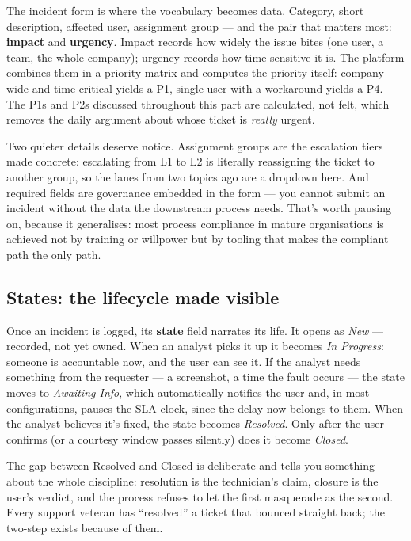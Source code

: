 The incident form is where the vocabulary becomes data. Category, short description, affected user, assignment group — and the pair that matters most: \textbf{impact} and \textbf{urgency}. Impact records how widely the issue bites (one user, a team, the whole company); urgency records how time-sensitive it is. The platform combines them in a priority matrix and computes the priority itself: company-wide and time-critical yields a P1, single-user with a workaround yields a P4. The P1s and P2s discussed throughout this part are calculated, not felt, which removes the daily argument about whose ticket is \emph{really} urgent.


Two quieter details deserve notice. Assignment groups are the escalation tiers made concrete: escalating from L1 to L2 is literally reassigning the ticket to another group, so the lanes from two topics ago are a dropdown here. And required fields are governance embedded in the form — you cannot submit an incident without the data the downstream process needs. That's worth pausing on, because it generalises: most process compliance in mature organisations is achieved not by training or willpower but by tooling that makes the compliant path the only path.



\subsection{States: the lifecycle made visible}


Once an incident is logged, its \textbf{state} field narrates its life. It opens as \emph{New} — recorded, not yet owned. When an analyst picks it up it becomes \emph{In Progress}: someone is accountable now, and the user can see it. If the analyst needs something from the requester — a screenshot, a time the fault occurs — the state moves to \emph{Awaiting Info}, which automatically notifies the user and, in most configurations, pauses the SLA clock, since the delay now belongs to them. When the analyst believes it's fixed, the state becomes \emph{Resolved}. Only after the user confirms (or a courtesy window passes silently) does it become \emph{Closed}.


The gap between Resolved and Closed is deliberate and tells you something about the whole discipline: resolution is the technician's claim, closure is the user's verdict, and the process refuses to let the first masquerade as the second. Every support veteran has ``resolved'' a ticket that bounced straight back; the two-step exists because of them.


